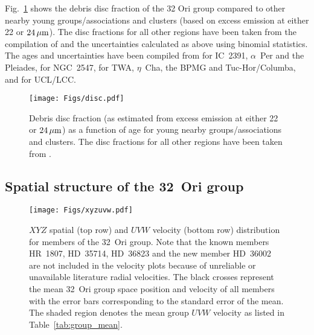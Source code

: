 \documentclass[usenatbib]{mnras}
\begin{document}
Fig.~\ref{fig:disc_fraction} shows the debris disc fraction of the
32 Ori group compared to other nearby young groups/associations
and clusters (based on excess emission at either 22 or $24\,\rm{\mu m}$).
The disc fractions for all other regions have been taken from the
compilation of \cite{Zuckerman12} and the uncertainties calculated as
above using binomial statistics. The ages and uncertainties have been compiled
from \cite*{Barrado04b} for IC~2391, $\alpha$~Per and the Pleiades,
\cite{Jeffries05} for NGC~2547, \cite{Bell15} for TWA, $\eta$~Cha, the BPMG and
Tuc-Hor/Columba, and \cite{Pecaut16} for UCL/LCC.

\begin{figure}
\centering
\texttt{[image: Figs/disc.pdf]}
\caption[]{Debris disc fraction (as estimated from excess emission
at either 22 or $24\,\rm{\mu m}$) as a function of age for young nearby
groups/associations and clusters. The disc fractions for all other regions
have been taken from \cite{Zuckerman12}.}
\label{fig:disc_fraction}
\end{figure}

\subsection{Spatial structure of the 32~Ori group}
\label{spatial_structure}

\begin{figure*}
\centering
\texttt{[image: Figs/xyzuvw.pdf]}
\caption[]{$XYZ$ spatial (top row) and $UVW$ velocity (bottom row)
  distribution for members of the 32~Ori group. Note that the known
  members HR~1807, HD~35714, HD~36823 and the new member HD~36002 are
  not included in the velocity plots because of unreliable or unavailable literature radial velocities.  The black crosses
  represent the mean 32~Ori group space position and velocity of all members with the
  error bars corresponding to the standard error of the mean. The
  shaded region denotes the mean group $UVW$ velocity as listed in Table~\ref{tab:group_mean}.}
\label{fig:xyzuvw}
\end{figure*}
\end{document}
